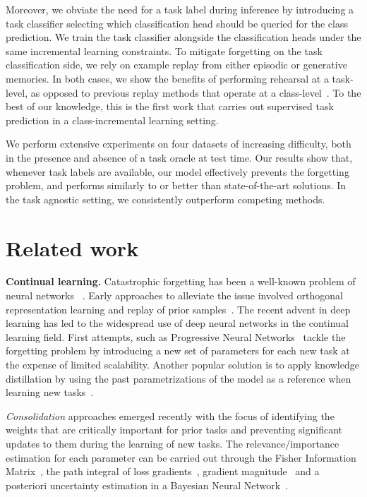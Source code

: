 \documentclass[10pt,twocolumn,letterpaper]{article}
\begin{document}
Moreover, we obviate the need for a task label during inference by introducing a task classifier selecting which classification head should be queried for the class prediction.
We train the task classifier alongside the classification heads under the same incremental learning constraints. 
To mitigate forgetting on the task classification side, we rely on example replay from either episodic or generative memories. 
In both cases, we show the benefits of performing rehearsal at a task-level, as opposed to previous replay methods that operate at a class-level~\cite{icarl,agem}.
To the best of our knowledge, this is the first work that carries out supervised task prediction in a class-incremental learning setting.

We perform extensive experiments on four datasets of increasing difficulty, both in the presence and absence of a task oracle at test time. Our results show that, whenever task labels are available, our model effectively prevents the forgetting problem, and performs similarly to or better than state-of-the-art solutions. In the task agnostic setting, we consistently outperform competing methods. \section{Related work}
\textbf{Continual learning.}
Catastrophic forgetting has been a well-known problem of neural networks ~\cite{mccloskey1989catastrophic}. Early approaches to alleviate the issue involved orthogonal representation learning and replay of prior samples~\cite{french1999catastrophic}. The recent advent in deep learning has led to the widespread use of deep neural networks in the continual learning field. First attempts, such as Progressive Neural Networks~\cite{progressivenns} tackle the forgetting problem by introducing a new set of parameters for each new task at the expense of limited scalability. Another popular solution is to apply knowledge distillation by using the past parametrizations of the model as a reference when learning new tasks~\cite{lwf}.

\textit{Consolidation} approaches emerged recently with the focus of identifying the weights that are critically important for prior tasks and preventing significant updates to them during the learning of new tasks. 
The relevance/importance estimation for each parameter can be carried out through the Fisher Information Matrix~\cite{ewc}, the path integral of loss gradients~\cite{si}, gradient magnitude~\cite{mas} and a posteriori uncertainty estimation in a Bayesian Neural Network~\cite{vcl}.
\end{document}
